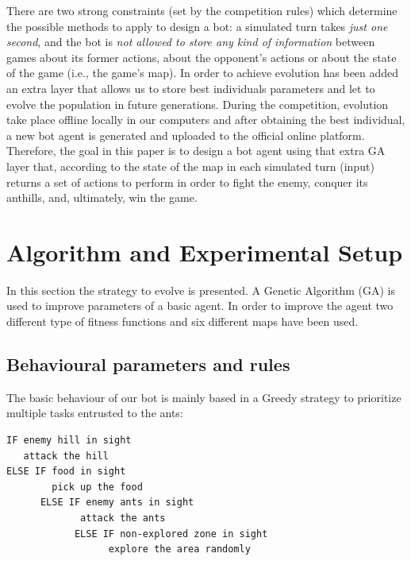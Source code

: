 \documentclass[runningheads]{llncs}
\begin{document}
There are two strong constraints (set by the competition rules) which determine the possible methods to apply to design a bot: a simulated turn takes \textit{just one second}, and the bot is \textit{not allowed to store any kind of information} between games about its former actions, about the opponent's actions or about the state of the game (i.e., the game's map). In order to achieve evolution has been added an extra layer that allows us to store best individuals parameters and let to evolve the population in future generations. During the competition, evolution take place offline locally in our computers and after obtaining the best individual, a new bot agent is generated and uploaded to the official online platform.
Therefore, the goal in this paper is to design a bot agent using that extra GA layer that, according to the state of the map in each simulated turn (input) returns a set of actions to perform in order to fight the enemy, conquer its anthills, and, ultimately, win the game. 




\section{Algorithm and Experimental Setup}

In this section the strategy to evolve is presented. A Genetic Algorithm (GA) is used to improve parameters of a basic agent.  In order to improve the agent two different type of fitness functions and six different maps have been used. 


\subsection{Behavioural parameters and rules}

The basic behaviour of our bot is mainly based in a Greedy strategy to prioritize multiple tasks entrusted to the ants:
\begin{verbatim}
IF enemy hill in sight
   attack the hill 
ELSE IF food in sight 
        pick up the food
	  ELSE IF enemy ants in sight
             attack the ants
		    ELSE IF non-explored zone in sight 
                  explore the area randomly
\end{verbatim}
\end{document}
